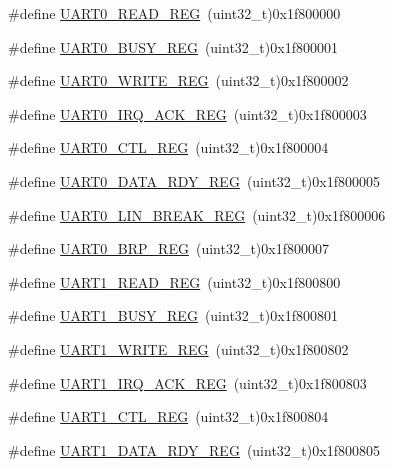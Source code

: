 \begin{DoxyCompactItemize}
\#define \mbox{\hyperlink{a00020_adf0b77619bb23d8267f4b3545c41b203}{U\+A\+R\+T0\+\_\+\+R\+E\+A\+D\+\_\+\+R\+EG}}~(uint32\+\_\+t)0x1f800000
\item 
\#define \mbox{\hyperlink{a00020_af8f66a832129380d8ea44cce8accb587}{U\+A\+R\+T0\+\_\+\+B\+U\+S\+Y\+\_\+\+R\+EG}}~(uint32\+\_\+t)0x1f800001
\item 
\#define \mbox{\hyperlink{a00020_a0b8a3edd01fd0c46cdc91862119181c7}{U\+A\+R\+T0\+\_\+\+W\+R\+I\+T\+E\+\_\+\+R\+EG}}~(uint32\+\_\+t)0x1f800002
\item 
\#define \mbox{\hyperlink{a00020_a8801fa41beb04f47deb6cb5a793998bb}{U\+A\+R\+T0\+\_\+\+I\+R\+Q\+\_\+\+A\+C\+K\+\_\+\+R\+EG}}~(uint32\+\_\+t)0x1f800003
\item 
\#define \mbox{\hyperlink{a00020_ab711d24b07d5586bb08931f6267aad94}{U\+A\+R\+T0\+\_\+\+C\+T\+L\+\_\+\+R\+EG}}~(uint32\+\_\+t)0x1f800004
\item 
\#define \mbox{\hyperlink{a00020_a63c2aa0987e94c838eba0927a9e5de9f}{U\+A\+R\+T0\+\_\+\+D\+A\+T\+A\+\_\+\+R\+D\+Y\+\_\+\+R\+EG}}~(uint32\+\_\+t)0x1f800005
\item 
\#define \mbox{\hyperlink{a00020_a2c2372d12c94d965a27a40650761c7ab}{U\+A\+R\+T0\+\_\+\+L\+I\+N\+\_\+\+B\+R\+E\+A\+K\+\_\+\+R\+EG}}~(uint32\+\_\+t)0x1f800006
\item 
\#define \mbox{\hyperlink{a00020_aecff503e10f17b6f757c4ff394d29952}{U\+A\+R\+T0\+\_\+\+B\+R\+P\+\_\+\+R\+EG}}~(uint32\+\_\+t)0x1f800007
\item 
\#define \mbox{\hyperlink{a00020_adb396c9307365d351769d5b390615613}{U\+A\+R\+T1\+\_\+\+R\+E\+A\+D\+\_\+\+R\+EG}}~(uint32\+\_\+t)0x1f800800
\item 
\#define \mbox{\hyperlink{a00020_aef385a4dd85d8e0016b8ac294b5c5267}{U\+A\+R\+T1\+\_\+\+B\+U\+S\+Y\+\_\+\+R\+EG}}~(uint32\+\_\+t)0x1f800801
\item 
\#define \mbox{\hyperlink{a00020_abab8d51f93ef3757295e4cd8d970cd99}{U\+A\+R\+T1\+\_\+\+W\+R\+I\+T\+E\+\_\+\+R\+EG}}~(uint32\+\_\+t)0x1f800802
\item 
\#define \mbox{\hyperlink{a00020_a17b5102c9191361521865fe0aa862d5b}{U\+A\+R\+T1\+\_\+\+I\+R\+Q\+\_\+\+A\+C\+K\+\_\+\+R\+EG}}~(uint32\+\_\+t)0x1f800803
\item 
\#define \mbox{\hyperlink{a00020_a4bbd538f18bab15e7779f61e434c9bdb}{U\+A\+R\+T1\+\_\+\+C\+T\+L\+\_\+\+R\+EG}}~(uint32\+\_\+t)0x1f800804
\item 
\#define \mbox{\hyperlink{a00020_a4ce70f3649a8d269a8d5cfdf74a4d584}{U\+A\+R\+T1\+\_\+\+D\+A\+T\+A\+\_\+\+R\+D\+Y\+\_\+\+R\+EG}}~(uint32\+\_\+t)0x1f800805

\end{DoxyCompactItemize}
